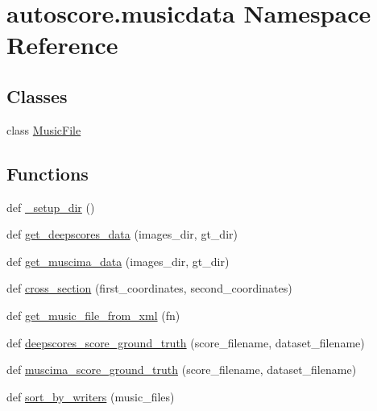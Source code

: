 \hypertarget{namespaceautoscore_1_1musicdata}{}\section{autoscore.\+musicdata Namespace Reference}
\label{namespaceautoscore_1_1musicdata}
\subsection*{Classes}
\begin{DoxyCompactItemize}
\item 
class \hyperlink{classautoscore_1_1musicdata_1_1MusicFile}{Music\+File}
\end{DoxyCompactItemize}
\subsection*{Functions}
\begin{DoxyCompactItemize}
\item 
def \hyperlink{namespaceautoscore_1_1musicdata_a36b9f5fe5a2cb7a9d515e6d31108d71a}{\+\_\+setup\+\_\+dir} ()
\item 
def \hyperlink{namespaceautoscore_1_1musicdata_a680b60ad4d68bf01c129bce2ed53ed13}{get\+\_\+deepscores\+\_\+data} (images\+\_\+dir, gt\+\_\+dir)
\item 
def \hyperlink{namespaceautoscore_1_1musicdata_a4cc1edc9297b14e64c6824bfc80391be}{get\+\_\+muscima\+\_\+data} (images\+\_\+dir, gt\+\_\+dir)
\item 
def \hyperlink{namespaceautoscore_1_1musicdata_aeaaa4a2e6a03894586dd145faf0be207}{cross\+\_\+section} (first\+\_\+coordinates, second\+\_\+coordinates)
\item 
def \hyperlink{namespaceautoscore_1_1musicdata_af800c02302b00cd70bc8d82a349f2c34}{get\+\_\+music\+\_\+file\+\_\+from\+\_\+xml} (fn)
\item 
def \hyperlink{namespaceautoscore_1_1musicdata_a74762dd30814e9d65c87c0d9f16895d9}{deepscores\+\_\+score\+\_\+ground\+\_\+truth} (score\+\_\+filename, dataset\+\_\+filename)
\item 
def \hyperlink{namespaceautoscore_1_1musicdata_ab473d740a7364fed122ad806ff33651c}{muscima\+\_\+score\+\_\+ground\+\_\+truth} (score\+\_\+filename, dataset\+\_\+filename)
\item 
def \hyperlink{namespaceautoscore_1_1musicdata_af4a4d05f09aeaa84bb9014d40d0c0309}{sort\+\_\+by\+\_\+writers} (music\+\_\+files)
\end{DoxyCompactItemize}
